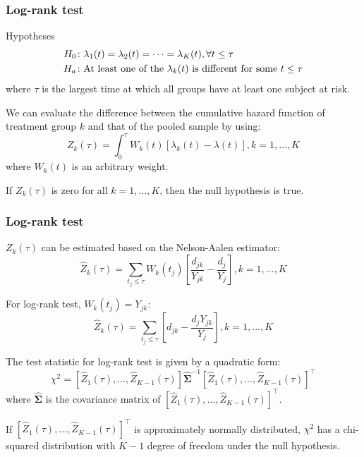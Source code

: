\documentclass[11pt, aspectratio = 169]{beamer}
\begin{document}
\begin{frame}
  \frametitle{Log-rank test}
  \begin{block}{Hypotheses}
    \begin{equation*}
      \begin{split}
        H_0&\colon \lambda_1(t) = \lambda_2(t) = \dotsb = \lambda_K(t), \forall t \le \tau \\
        H_a&\colon \textnormal{At least one of the}\ \lambda_k(t)\ \textnormal{is different for some}\ t \le \tau
      \end{split}
    \end{equation*}
    where $\tau$ is the largest time at which all groups have at least one subject at risk.
  \end{block}
  
  We can evaluate the difference between the cumulative hazard function of treatment group $k$ and that of the pooled sample by using:
  \begin{equation*}
    Z_k(\tau) = \int_{0}^{\tau} W_k(t)\left[\lambda_k(t) - \lambda(t)\right], k = 1,\dotsc,K
  \end{equation*}
  where $W_k(t)$ is an arbitrary weight.

  If $Z_k(\tau)$ is zero for all $k = 1,\dotsc,K$, then the null hypothesis is true.
\end{frame}

\begin{frame}
  \frametitle{Log-rank test}
  $Z_k(\tau)$ can be estimated based on the Nelson-Aalen estimator:
  \begin{equation*}
    \hat{Z}_k(\tau) = \sum_{t_j \le \tau} W_k\left(t_j\right) \left[\frac{d_{jk}}{Y_{jk}} - \frac{d_j}{Y_j}\right], k = 1,\dotsc,K
  \end{equation*}

  For log-rank test, $W_k\left(t_j\right) = Y_{jk}$:
  \begin{equation*}
    \hat{Z}_k(\tau) = \sum_{t_j \le \tau} \left[d_{jk} - \frac{d_j Y_{jk}}{Y_j}\right], k = 1,\dotsc,K
  \end{equation*}

  The test statistic for log-rank test is given by a quadratic form:
  \begin{equation*}
    \chi^2 = \left[\hat{Z}_1(\tau),\dotsc,\hat{Z}_{K-1}(\tau)\right] \hat{\boldsymbol{\Sigma}}^{-1} \left[\hat{Z}_1(\tau),\dotsc,\hat{Z}_{K-1}(\tau)\right]^\top
  \end{equation*}
  where $\hat{\boldsymbol{\Sigma}}$ is the covariance matrix of $\left[\hat{Z}_1(\tau),\dotsc,\hat{Z}_{K-1}(\tau)\right]^\top$.
  
  If $\left[\hat{Z}_1(\tau),\dotsc,\hat{Z}_{K-1}(\tau)\right]^\top$ is approximately normally distributed, $\chi^2$ has a chi-squared distribution with $K - 1$ degree of freedom under the null hypothesis.
\end{frame}
\end{document}
